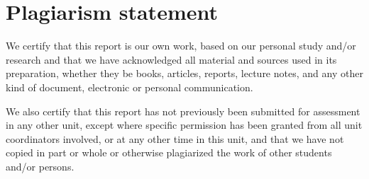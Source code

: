 \section*{Plagiarism statement}

We certify that this report is our own work, based on our personal study and/or research and that we have acknowledged all material and sources used in its preparation, whether they be books, articles, reports, lecture notes, and any other kind of document, electronic or personal communication.

We also certify that this report has not previously been submitted for assessment in any other unit, except where specific permission has been granted from all unit coordinators involved, or at any other time in this unit, and that we have not copied in part or whole or otherwise plagiarized the work of other students and/or persons.

\newpage
